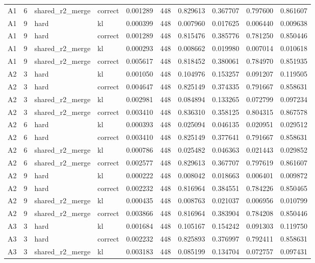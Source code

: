 \begin{tabular}{lrllrrrrrr}
A1 & 6 & shared_r2_merge & correct & 0.001289 & 448 & 0.829613 & 0.367707 & 0.797600 & 0.861607 \\
A1 & 9 & hard & kl & 0.000399 & 448 & 0.007960 & 0.017625 & 0.006440 & 0.009638 \\
A1 & 9 & hard & correct & 0.001289 & 448 & 0.815476 & 0.385776 & 0.781250 & 0.850446 \\
A1 & 9 & shared_r2_merge & kl & 0.000293 & 448 & 0.008662 & 0.019980 & 0.007014 & 0.010618 \\
A1 & 9 & shared_r2_merge & correct & 0.005617 & 448 & 0.818452 & 0.380061 & 0.784970 & 0.851935 \\
A2 & 3 & hard & kl & 0.001050 & 448 & 0.104976 & 0.153257 & 0.091207 & 0.119505 \\
A2 & 3 & hard & correct & 0.004647 & 448 & 0.825149 & 0.374335 & 0.791667 & 0.858631 \\
A2 & 3 & shared_r2_merge & kl & 0.002981 & 448 & 0.084894 & 0.133265 & 0.072799 & 0.097234 \\
A2 & 3 & shared_r2_merge & correct & 0.003410 & 448 & 0.836310 & 0.358125 & 0.804315 & 0.867578 \\
A2 & 6 & hard & kl & 0.000393 & 448 & 0.025094 & 0.046135 & 0.020951 & 0.029512 \\
A2 & 6 & hard & correct & 0.003410 & 448 & 0.825149 & 0.377641 & 0.791667 & 0.858631 \\
A2 & 6 & shared_r2_merge & kl & 0.000786 & 448 & 0.025482 & 0.046363 & 0.021443 & 0.029852 \\
A2 & 6 & shared_r2_merge & correct & 0.002577 & 448 & 0.829613 & 0.367707 & 0.797619 & 0.861607 \\
A2 & 9 & hard & kl & 0.000222 & 448 & 0.008042 & 0.018663 & 0.006401 & 0.009872 \\
A2 & 9 & hard & correct & 0.002232 & 448 & 0.816964 & 0.384551 & 0.784226 & 0.850465 \\
A2 & 9 & shared_r2_merge & kl & 0.000435 & 448 & 0.008763 & 0.021037 & 0.006956 & 0.010799 \\
A2 & 9 & shared_r2_merge & correct & 0.003866 & 448 & 0.816964 & 0.383904 & 0.784208 & 0.850446 \\
A3 & 3 & hard & kl & 0.001684 & 448 & 0.105167 & 0.154242 & 0.091303 & 0.119750 \\
A3 & 3 & hard & correct & 0.002232 & 448 & 0.825893 & 0.376997 & 0.792411 & 0.858631 \\
A3 & 3 & shared_r2_merge & kl & 0.003183 & 448 & 0.085199 & 0.134704 & 0.072757 & 0.097431 \\

\end{tabular}
